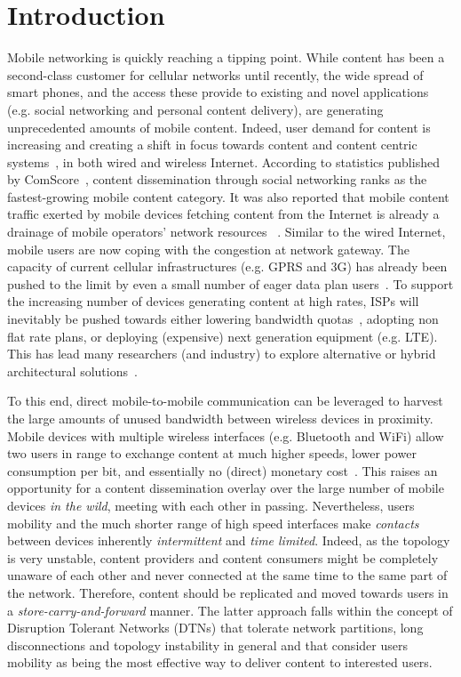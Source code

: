 ﻿\chapter{Introduction}
\label{chapter:Introduction}

Mobile networking is quickly reaching a tipping point. While content has been a second-class customer for cellular networks until recently, the wide spread of smart phones, and the access these provide to existing and novel applications (e.g. social networking and personal content delivery), are generating unprecedented amounts of mobile content. Indeed, user demand for content is increasing and creating a shift in focus towards content and content centric systems~\cite{CCN}, in both wired and wireless Internet. According to statistics published by ComScore~\cite{ComScore}, content dissemination through social networking ranks as the fastest-growing mobile content category. It was also reported that mobile content traffic exerted by mobile devices fetching content from the Internet is already a drainage of mobile operators' network resources~\cite{ATT,ATT2,Killer-DTN} . Similar to the wired Internet, mobile users are now coping with the congestion at network gateway. The capacity of current cellular infrastructures (e.g. GPRS and 3G) has already been pushed to the limit by even a small number of eager data plan users~\cite{ATT}. To support the increasing number of devices generating content at high rates, ISPs will inevitably be pushed towards either lowering bandwidth quotas~\cite{ATT}, adopting non flat rate plans, or deploying (expensive) next generation equipment (e.g. LTE). This has lead many researchers (and industry) to explore alternative or hybrid architectural solutions~\cite{CellOffLoading,Augmenting3G}. 

To this end, direct mobile-to-mobile communication can be leveraged to harvest the large amounts of unused bandwidth between wireless devices in proximity. Mobile devices with multiple wireless interfaces (e.g. Bluetooth and WiFi) allow two users in range to exchange content at much higher speeds, lower power consumption per bit, and essentially no (direct) monetary cost~\cite{Energy-Delay}. This raises an opportunity for a content dissemination overlay over the large number of mobile devices \emph{in the wild}, meeting with each other in passing. Nevertheless, users mobility and the much shorter range of high speed interfaces make \emph{contacts} between devices inherently \emph{intermittent} and \emph{time limited}. Indeed, as the topology is very unstable, content providers and content consumers might be completely unaware of each other and never connected at the same time to the same part of the network. Therefore, content should be replicated and moved towards users in a \emph{store-carry-and-forward} manner. The latter approach falls within the concept of Disruption Tolerant Networks (DTNs) that tolerate network partitions, long disconnections and topology instability in general and that consider users mobility as being the most effective way to deliver content to interested users. 


